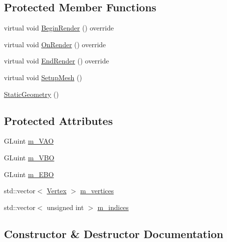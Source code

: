 \subsection*{Protected Member Functions}
\begin{DoxyCompactItemize}
\item 
virtual void \mbox{\hyperlink{classec_1_1_static_geometry_a58dfe3cc7d91f3bcf99d83b038cf5f1d}{Begin\+Render}} () override
\item 
virtual void \mbox{\hyperlink{classec_1_1_static_geometry_aa10330a07bc5ccd18d0d61c4c965bccd}{On\+Render}} () override
\item 
virtual void \mbox{\hyperlink{classec_1_1_static_geometry_a2a66505344ad1a9eac31da2cf8171ea9}{End\+Render}} () override
\item 
virtual void \mbox{\hyperlink{classec_1_1_static_geometry_a7b45ea19c8ca6662d90993f29648049d}{Setup\+Mesh}} ()
\item 
\mbox{\hyperlink{classec_1_1_static_geometry_ad707c706ce148f5c9d6d8ddb2321807b}{Static\+Geometry}} ()
\end{DoxyCompactItemize}
\subsection*{Protected Attributes}
\begin{DoxyCompactItemize}
\item 
G\+Luint \mbox{\hyperlink{classec_1_1_static_geometry_a7334854b00afa43e3ce02ce2e0600631}{m\+\_\+\+V\+AO}}
\item 
G\+Luint \mbox{\hyperlink{classec_1_1_static_geometry_a14a581a93ea66ca97c79d554390fbd7b}{m\+\_\+\+V\+BO}}
\item 
G\+Luint \mbox{\hyperlink{classec_1_1_static_geometry_a8cb4320862c6051fbef63b04ffb2333b}{m\+\_\+\+E\+BO}}
\item 
std\+::vector$<$ \mbox{\hyperlink{structec_1_1_vertex}{Vertex}} $>$ \mbox{\hyperlink{classec_1_1_static_geometry_a7407d00e3c3a4157cc3a3d1ac5000631}{m\+\_\+vertices}}
\item 
std\+::vector$<$ unsigned int $>$ \mbox{\hyperlink{classec_1_1_static_geometry_a0a4c4722d3fe82b4b78dd23782c17862}{m\+\_\+indices}}
\end{DoxyCompactItemize}


\subsection{Constructor \& Destructor Documentation}
\mbox{\label{classec_1_1_static_geometry_a47d1f09c1042762be9a9d4a492db2366}} 
